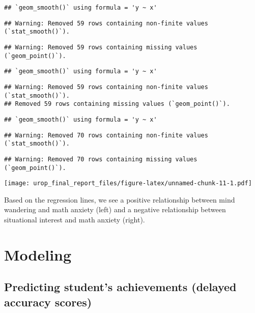 \documentclass[
]{article}
\begin{document}
\begin{verbatim}
## `geom_smooth()` using formula = 'y ~ x'
\end{verbatim}

\begin{verbatim}
## Warning: Removed 59 rows containing non-finite values (`stat_smooth()`).
\end{verbatim}

\begin{verbatim}
## Warning: Removed 59 rows containing missing values (`geom_point()`).
\end{verbatim}

\begin{verbatim}
## `geom_smooth()` using formula = 'y ~ x'
\end{verbatim}

\begin{verbatim}
## Warning: Removed 59 rows containing non-finite values (`stat_smooth()`).
## Removed 59 rows containing missing values (`geom_point()`).
\end{verbatim}

\begin{verbatim}
## `geom_smooth()` using formula = 'y ~ x'
\end{verbatim}

\begin{verbatim}
## Warning: Removed 70 rows containing non-finite values (`stat_smooth()`).
\end{verbatim}

\begin{verbatim}
## Warning: Removed 70 rows containing missing values (`geom_point()`).
\end{verbatim}

\texttt{[image: urop\_final\_report\_files/figure-latex/unnamed-chunk-11-1.pdf]}

Based on the regression lines, we see a positive relationship between
mind wandering and math anxiety (left) and a negative relationship
between situational interest and math anxiety (right).

\hypertarget{modeling}{%
\section{Modeling}\label{modeling}}

\hypertarget{predicting-students-achievements-delayed-accuracy-scores}{%
\subsection{Predicting student's achievements (delayed accuracy
scores)}\label{predicting-students-achievements-delayed-accuracy-scores}}
\end{document}
